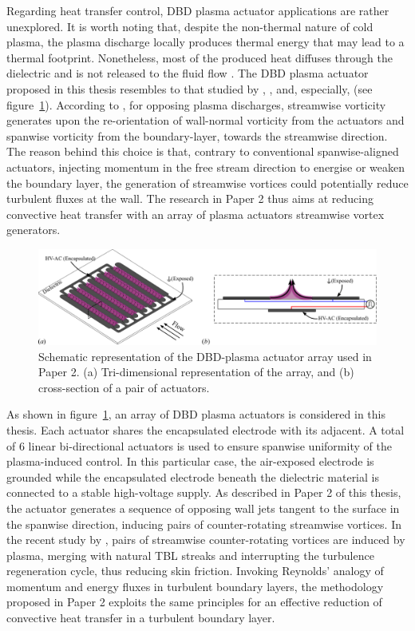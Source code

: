 Regarding heat transfer control, DBD plasma actuator applications are rather unexplored. It is worth noting that, despite the non-thermal nature of cold plasma, the plasma discharge locally produces thermal energy that may lead to a thermal footprint. Nonetheless, most of the produced heat diffuses through the dielectric and is not released to the fluid flow \citep{Rodrigues2018,Jukes2006}. The DBD plasma actuator proposed in this thesis resembles to that studied by \citet{Whalley2014}, \citet{Wittig2019VGplasma}, and, especially, \citet{cheng_wong_hussain_schroder_zhou_2021} (see figure~\ref{fig:dbd_actuator}). According to \citet{Wicks2015}, for opposing plasma discharges, streamwise vorticity generates upon the re-orientation of wall-normal vorticity from the actuators and spanwise vorticity from the boundary-layer, towards the streamwise direction. The reason behind this choice is that, contrary to conventional spanwise-aligned actuators, injecting momentum in the free stream direction to energise or weaken the boundary layer, the generation of streamwise vortices could potentially reduce turbulent fluxes at the wall. The research in Paper 2 thus aims at reducing convective heat transfer with an array of plasma actuators streamwise vortex generators. 

\begin{figure}
    \centering
    \includegraphics[width = 0.99\linewidth]{figures/dbd_actuator.pdf}
    \caption{Schematic representation of the DBD-plasma actuator array used in Paper 2. (a) Tri-dimensional representation of the array, and (b) cross-section of a pair of actuators.}
    \label{fig:dbd_actuator}
\end{figure}

As shown in figure~\ref{fig:dbd_actuator}, an array of DBD plasma actuators is considered in this thesis. Each actuator shares the encapsulated electrode with its adjacent. A total of 6 linear bi-directional actuators is used to ensure spanwise uniformity of the plasma-induced control. In this particular case, the air-exposed electrode is grounded while the encapsulated electrode beneath the dielectric material is connected to a stable high-voltage supply. As described in Paper 2 of this thesis, the actuator generates a sequence of opposing wall jets tangent to the surface in the spanwise direction, inducing pairs of counter-rotating streamwise vortices. In the recent study by \citet{cheng_wong_hussain_schroder_zhou_2021}, pairs of streamwise counter-rotating vortices are induced by plasma, merging with natural TBL streaks and interrupting the turbulence regeneration cycle, thus reducing skin friction. Invoking Reynolds' analogy of momentum and energy fluxes in turbulent boundary layers, the methodology proposed in Paper 2 exploits the same principles for an effective reduction of convective heat transfer in a turbulent boundary layer.

